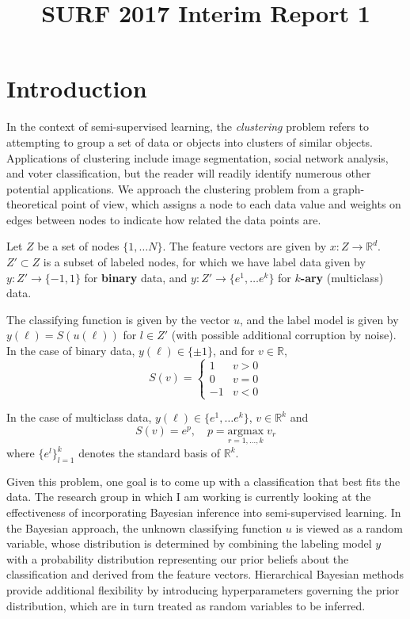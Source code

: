 \documentclass{siamart1116}
\title{SURF 2017 Interim Report 1}
\author{\TheAuthors}
\date{}
\begin{document}
\maketitle
\setlength{\unitlength}{1in}
\setlength{\parindent}{0in}

\section{Introduction}
In the context of semi-supervised learning, the \textit{clustering} problem refers to attempting to group a set of data or objects into clusters of similar objects. Applications of clustering include image segmentation, social network analysis, and voter classification, but the reader will readily identify numerous other potential applications. We approach the clustering problem from a graph-theoretical point of view, which assigns a node to each data value and weights on edges between nodes to indicate how related the data points are.

Let $Z$ be a set of nodes $\{1, \ldots N\}$. The feature vectors are given by $x : Z \rightarrow \mathbb{R}^d$. $Z' \subset Z$ is a subset of labeled nodes, for which we have label data given by $y : Z' \to \{-1, 1\}$ for {\bf binary} data, and $y : Z' \to \{e^1, \ldots e^k\}$ for {\bf $k$-ary} (multiclass) data.


The classifying function is given by the vector $u$, and the label model is given by $y(\ell) = S(u(\ell))$ for $l \in Z'$ (with possible additional corruption by noise). In the case of binary data, $y(\ell) \in \{\pm 1\}$, and for $v \in \mathbb{R}$,
\[
S(v) = \begin{cases}
1 & v>0\\
0 & v=0\\
-1 & v<0
\end{cases}
\]

In the case of multiclass data, $y(\ell) \in \{e^1, \ldots e^k\}$, $v \in \mathbb{R}^k$ and
\[
S(v) = e^p, \quad p = \underset{r =1,\ldots,k}{\mathrm{argmax}}\;v_r
\]
where $\{e^l\}_{l=1}^k$ denotes the standard basis of $\mathbb{R}^k$.

Given this problem, one goal is to come up with a classification that best fits the data. The research group in which I am working is currently looking at the effectiveness of incorporating Bayesian inference into semi-supervised learning. In the Bayesian approach, the unknown classifying function $u$ is viewed as a random variable, whose distribution is determined by combining the labeling model $y$ with a probability distribution representing our prior beliefs about the classification and derived from the feature vectors. Hierarchical Bayesian methods provide additional flexibility by introducing hyperparameters governing the prior distribution, which are in turn treated as random variables to be inferred.
\end{document}
